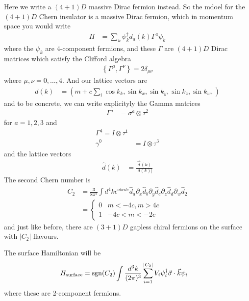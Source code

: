 Here we write a $(4+1)D$ massive Dirac fermion instead.
So the mdoel for the $(4+1)D$ Chern insulator is a massive Dirac fermion,
which in momentum space you would write
\begin{align}
    H &= \sum_k \psi_k^\dagger d_a(k)\Gamma^a \psi_k
\end{align}
where the $\psi_k$ are 4-component fermions,
and these $\Gamma$ are $(4+1)D$ Dirac matrices which satisfy the Clifford
algebra
\begin{align}
    \left\{ \Gamma^\mu, \Gamma^\nu \right\} = 2\delta_{\mu\nu}
\end{align}
where $\mu,\nu=0,\ldots,4$.
And our lattice vectors are
\begin{align}
    d(k) &=
    \left( 
    m + c\sum_{i}\cos k_k,
    \sin k_x,
    \sin k_y,
    \sin k_z,
    \sin k_w,
    \right)
\end{align}
and to be concrete,
we can write explicityly the Gamma matrices
\begin{align}
    \Gamma^a &=
    \sigma^a \otimes \tau^2
\end{align}
for $a=1,2,3$
and
\begin{align}
    \Gamma^4 = I\otimes \tau^1\\
    \gamma^0 &= I\otimes \tau^3
\end{align}
and the lattice vectors
\begin{align}
    \hat{d}(k) &=
    \frac{\vec{d}(k)}{|d(k)|}
\end{align}
The second Chern number is
\begin{align}
    C_2 &=
    \frac{3}{8\pi^2}
    \int d^4k
    \epsilon^{abcde}
    \hat{d}_a
    \partial_x \hat{d}_b
    \partial_y \hat{d}_c
    \partial_z \hat{d}_d
    \partial_w \hat{d}_2\\
    &=
    \begin{cases}
        0 & m < -4c, m >4c\\
        1 & -4c < m < -2c
    \end{cases}
\end{align}
and just like before,
there are $(3+1)D$ gapless chiral fermions on the surface with
$|C_2|$ flavours.

The surface Hamiltonian will be
\begin{align}
    H_{\mathrm{surface}} &=
    \operatorname{sgn}(C_2)
    \int \frac{d^3k}{(2\pi)^3}
    \sum_{i=1}^{|C_2|}
    V_i \psi_i^\dagger \vec{\sigma}\cdot\vec{k} \psi_i
\end{align}
where these are 2-component fermions.

